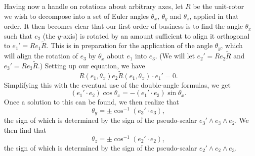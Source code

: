 \documentclass[12pt]{article}
\begin{document}
Having now a handle on rotations about arbitrary axes, let $R$ be the unit-rotor we wish to decompose
into a set of Euler angles $\theta_x$, $\theta_y$ and $\theta_z$, applied in that order.  It then becomes
clear that our first order of business is to find the angle $\theta_x$ such that $e_2$ (the $y$-axis) is
rotated by an amount sufficient to align it orthogonal to $e_1'=Re_1\tilde{R}$.  This is in preparation for the application
of the angle $\theta_y$, which will align the rotation of $e_3$ by $\theta_x$ about $e_1$ into $e_3$.
(We will let $e_2'=Re_2\tilde{R}$ and $e_3'=Re_3\tilde{R}$.)
Setting up our equation, we have
\begin{equation*}
R(e_1,\theta_x)e_2\tilde{R}(e_1,\theta_x)\cdot e_1' = 0.
\end{equation*}
Simplifying this with the eventual use of the double-angle formulas, we get
\begin{equation*}
(e_1'\cdot e_2)\cos\theta_x = -(e_1'\cdot e_3)\sin\theta_x.
\end{equation*}
Once a solution to this can be found, we then realize that
\begin{equation*}
\theta_y = \pm\cos^{-1}(e_3'\cdot e_3),
\end{equation*}
the sign of which is determined by the sign of the pseudo-scalar $e_3'\wedge e_3\wedge e_2$.
We then find that
\begin{equation*}
\theta_z = \pm\cos^{-1}(e_2'\cdot e_2),
\end{equation*}
the sign of which is determined by the sign of the pseudo-scalar $e_2'\wedge e_2\wedge e_3$.
\end{document}
